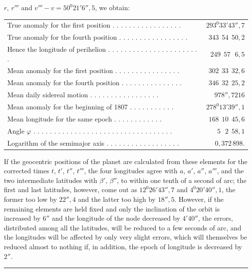 $r$, $r'''$ and $v'''-v = 50^{0}21'6''{,}5$,
we obtain:
\begin{center}
\begingroup\fontsize{9}{11}\selectfont\setlength{\tabcolsep}{3pt}
\begin{tabular}{@{}lr@{}}
True anomaly for the first position . . . . . . . . . . . . . . . . . & $293^{0}33'43''{,}7$ \\
True anomaly for the fourth position . . . . . . . . . . . . . . . . . & $343\ \ 54\ \ 50{,}2$ \\
Hence the longitude of perihelion . . . . . . . . . . . . . . . . . . . . . . . & $249\ \ 57\ \ \ 6{,}5$ \\
Mean anomaly for the first position . . . . . . . . . . . . . . . . & $302\ \ 33\ \ 32{,}6$ \\
Mean anomaly for the fourth position . . . . . . . . . . . . . . . & $346\ \ 32\ \ 25{,}2$ \\
Mean daily sidereal motion . . . . . . . . . . . . . . . . . & $978''{,}7216$ \\
Mean anomaly for the beginning of 1807 . . . . . . . . . . . & $278^{0}13'39''{,}1$ \\
Mean longitude for the same epoch . . . . . . . . . . . . & $168\ \ 10\ \ 45{,}6$ \\
Angle $\varphi$ . . . . . . . . . . . . . . . . . . . . . . . . . . . . . . . . . . & $5\ \ \ 2\ \ 58{,}1$ \\
Logarithm of the semimajor axis . . . . . . . . . . . . . . . . . . & $0{,}372\,898.$
\end{tabular}\endgroup
\end{center}

If the geocentric positions of the planet are calculated from these elements for the corrected times $t$, $t'$, $t''$, $t'''$,
the four longitudes agree with $a$, $a'$,
$a''$, $a'''$, and the two intermediate latitudes with $\beta'$, $\beta''$, to within
one tenth of a second of arc; the first and last latitudes, however,
come out as $12^{0}26'43''{,}7$ and $4^{0}20'40''{,}1$, the former too low by $22''{,}4$
and the latter too high by $18''{,}5$. However, if the remaining elements are held fixed
and only the inclination of the orbit is increased by $6''$ and the longitude of the node decreased by $4' 40''$,
the errors, distributed among all the latitudes, will be reduced to a few
seconds of arc, and the longitudes will be affected by only very slight errors,
which will themselves be reduced almost to nothing if, in addition,
the epoch of longitude is decreased by $2''$.
\par\medskip\begin{center}\rule{.24\linewidth}{.35pt}\end{center}
